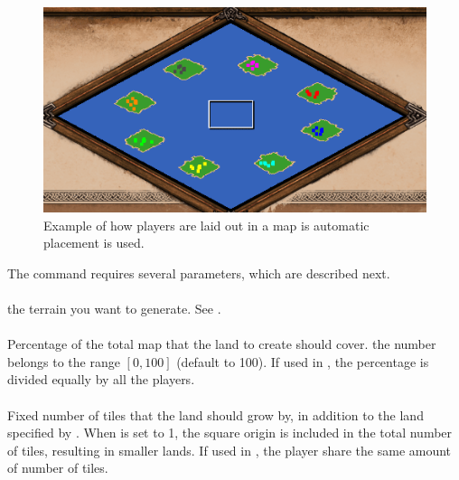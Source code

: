     \begin{figure}
        \centering
        \includegraphics[width=1.0\textwidth]{src/images/create-player-lands}
        \caption{Example of how players are laid out in a map is automatic placement is used.}
        \label{fig:create-player-lands}
    \end{figure}

    The command requires several parameters, which are described next.
    
    \paragraph{}
    the terrain you want to generate. See .

    \paragraph{}
    Percentage of the total map that the land to create should cover. the number belongs to the range $[0,100]$ (default to 100). If used in , the percentage is divided equally by all the players.

    \paragraph{}
    Fixed number of tiles that the land should grow by, in addition to the land specified by . When  is set to 1, the square origin is included in the total number of tiles, resulting in smaller lands. If used in , the player share the same amount of number of tiles.

